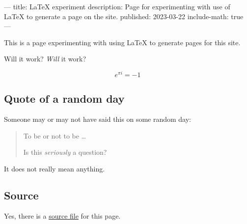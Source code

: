 ---
title: LaTeX experiment
description: Page for experimenting with use of LaTeX to generate a page on the site.
published: 2023-03-22
include-math: true
---
\usepackage{hyperref}

This is a page experimenting with using LaTeX to generate pages for this site.

Will it work?  \emph{Will} it work?

\[ e^{\pi i} = -1 \]

\subsection{Quote of a random day}

Someone may or may not have said this on some random day:

\begin{quote}
  To be or not to be \ldots

  Is this \emph{seriously} a question?
\end{quote}

It does not really mean anything.

\subsection{Source}

Yes, there is a \href{https://github.com/chungyc/site-personal/tree/main/site/article/technical/website/experiments/latex.tex}{source file}
for this page.

